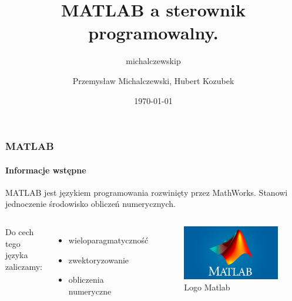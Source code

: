 \documentclass[aspectratio=169]{beamer}
\author{michalczewskip}
\title[PUST]{MATLAB a sterownik programowalny.
}
\author{Przemysław Michalczewski, Hubert Kozubek}
\date{\today}
\begin{document}
\begin{frame}[plain]
\maketitle
\end{frame}





\begin{frame}
\frametitle{MATLAB}
\framesubtitle{Informacje wstępne}

 MATLAB jest językiem programowania rozwinięty przez MathWorks. Stanowi jednoczenie środowisko obliczeń numerycznych.
\newline
\begin{columns} 

Do cech tego języka zaliczamy:

\begin{itemize}
  \item wieloparagmatyczność
  \item zwektoryzowanie
  \item obliczenia numeryczne
\end{itemize}


\begin{figure}
	\includegraphics[width=\linewidth]{Rysunki/MATLAB-Symbol.jpg}
	\caption {Logo Matlab}
\end{figure}

\end{columns}

\end{frame}
\end{document}
